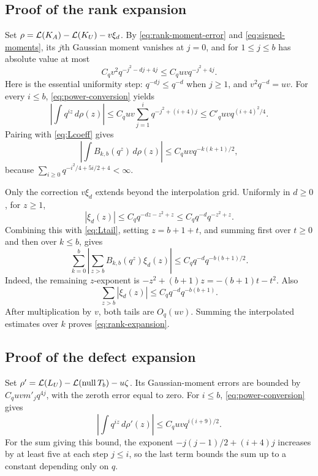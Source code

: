 \subsection{Proof of the rank expansion}

Set \(\rho=\mathcal L(K_A)-\mathcal L(K_U)-v\xi_d\).
By \eqref{eq:rank-moment-error} and \eqref{eq:signed-moments}, its \(j\)th Gaussian
moment vanishes at \(j=0\), and for \(1\le j\le b\) has absolute value
at most
\[
 C_q v^2q^{-j^2-dj+4j}
 \le C_q uvq^{-j^2+4j}.
\]
Here is the essential uniformity step:
\(q^{-dj}\le q^{-d}\) when \(j\ge1\), and \(v^2q^{-d}=uv\).
For every \(i\le b\), \eqref{eq:power-conversion} yields
\begin{equation}\label{eq:rank-power-error}
 \left|\int q^{iz}\,d\rho(z)\right|
   \le C_q uv\sum_{j=1}^i q^{-j^2+(i+4)j}
   \le C'_q uvq^{(i+4)^2/4}.
\end{equation}
Pairing with \eqref{eq:Lcoeff} gives
\[
 \left|\int B_{k,b}(q^z)\,d\rho(z)\right|
 \le C_q uvq^{-k(k+1)/2},
\]
because
\(\sum_{i\ge0}q^{-i^2/4+5i/2+4}<\infty\).

Only the correction \(v\xi_d\) extends beyond the interpolation grid.
Uniformly in \(d\ge0\), for \(z\ge1\),
\[
 |\xi_d(z)|\le C_q q^{-dz-z^2+z}
             \le C_q q^{-d}q^{-z^2+z}.
\]
Combining this with \eqref{eq:Ltail}, setting \(z=b+1+t\), and summing
first over \(t\ge0\) and then over \(k\le b\), gives
\begin{equation}\label{eq:rank-tail}
 \sum_{k=0}^b\left|
    \sum_{z>b}B_{k,b}(q^z)\xi_d(z)\right|
 \le C_q q^{-d}q^{-b(b+1)/2}.
\end{equation}
Indeed, the remaining \(z\)-exponent is
\(-z^2+(b+1)z=-(b+1)t-t^2\).
Also
\[
 \sum_{z>b}|\xi_d(z)|
       \le C_q q^{-d}q^{-b(b+1)}.
\]
After multiplication by \(v\), both tails are \(O_q(uv)\).
Summing the interpolated estimates over \(k\) proves
\eqref{eq:rank-expansion}.

\subsection{Proof of the defect expansion}

Set
\(\rho'=\mathcal L(L_U)-\mathcal L(\operatorname{null} T_b)-u\zeta\).
Its Gaussian-moment errors are bounded by
\(C_q uvm'_jq^{4j}\), with the zeroth error equal to zero.
For \(i\le b\), \eqref{eq:power-conversion} gives
\begin{equation}\label{eq:defect-power-error}
 \left|\int q^{iz}\,d\rho'(z)\right|
 \le C_q uvq^{i(i+9)/2}.
\end{equation}
For the sum giving this bound, the exponent
\(-j(j-1)/2+(i+4)j\) increases by at least five at each step
\(j\le i\), so the last term bounds the sum up to a constant
depending only on \(q\).

